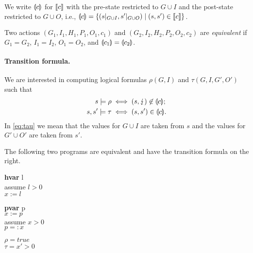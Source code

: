 \documentclass[runningheads,orivec]{llncs}
\begin{document}
We write $\llparenthesis c \rrparenthesis$ for $\llbracket c \rrbracket$ with the pre-state restricted to $G \cup I$ and the post-state restricted to $G \cup O$, i.e., $\llparenthesis c \rrparenthesis = \{ (s|_{G \cup I},s'|_{G \cup O}) \mid (s,s') \in \llbracket c \rrbracket \}$.

Two actions $(G_1,I_1,H_1,P_1,O_1,c_1)$ and $(G_2,I_2,H_2,P_2,O_2,c_2)$ are \emph{equivalent} if $G_1=G_2$, $I_1=I_2$, $O_1=O_2$, and $\llparenthesis c_1 \rrparenthesis=\llparenthesis c_2 \rrparenthesis$.

\paragraph{Transition formula.}
%
We are interested in computing logical formulas $\rho(G,I)$ and $\tau(G,I,G',O')$ such that
\begin{align}
  s \models \rho    &\iff (s,\lightning) \not\in \llparenthesis c \rrparenthesis; \\
  s,s' \models \tau &\iff (s,s') \in \llparenthesis c \rrparenthesis. \label{eq:tau}
\end{align}
%
In \eqref{eq:tau} we mean that the values for $G \cup I$ are taken from $s$ and the values for $G' \cup O'$ are taken from $s'$.

\begin{example}
The following two programs are equivalent and have the transition formula on the right.
\begin{center}
\begin{minipage}{3cm}
\begin{tabbing}
\textbf{hvar} l \\
assume $l > 0$ \\
$x := l$
\end{tabbing}
\end{minipage}
\hspace{1cm}
\begin{minipage}{3cm}
\begin{tabbing}
\textbf{pvar} p \\
$x := p$ \\
assume $x > 0$ \\
$p =: x$
\end{tabbing}
\end{minipage}
\hspace{1cm}
\begin{minipage}{3cm}
\begin{tabbing}
$\rho = true$ \\
$\tau = x' > 0$
\end{tabbing}
\end{minipage}
\end{center}
\end{example}



\end{document}
